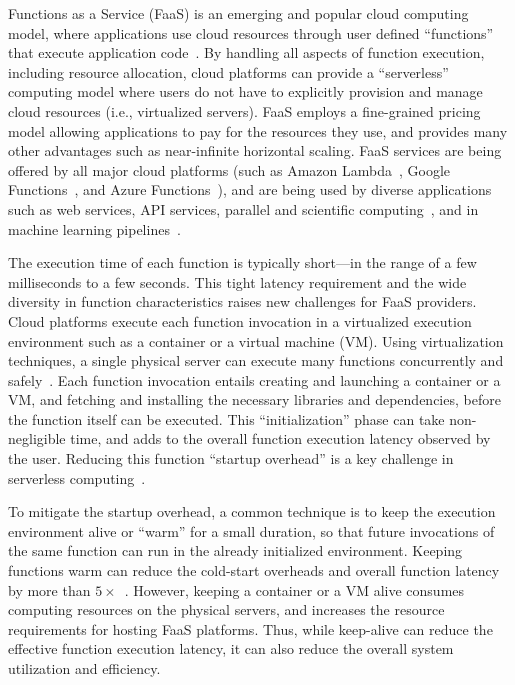 
Functions as a Service (FaaS) is an emerging and popular cloud computing model, where applications use cloud resources through user defined ``functions'' that execute application code~\cite{jonas2017occupy,jonas_cloud_2019,van_eyk_spec_2017}.
By handling all aspects of function execution, including resource allocation, cloud platforms can  provide a ``serverless'' computing model where users do not have to explicitly provision and manage cloud resources (i.e., virtualized servers).
FaaS employs a fine-grained pricing model allowing applications to pay for the resources they use, and provides many other advantages such as near-infinite horizontal scaling. 
FaaS services are being offered by all major cloud platforms (such as Amazon Lambda~\cite{aws-lambda}, Google Functions~\cite{google-functions}, and Azure Functions~\cite{azure-functions}), and are being used by diverse applications such as web services, API services,  parallel and scientific computing~\cite{funcx_hpdc_20,john_sweep_2019,fouladi_laptop_2019}, and in machine learning pipelines~\cite{carreira2018case, carreira_cirrus_2019}. 


The execution time of each function is typically short---in the range of a few milliseconds to a few seconds.
This tight latency requirement and the wide diversity in function characteristics raises new challenges for FaaS providers. 
Cloud platforms execute each function invocation in a virtualized execution environment such as a container or a virtual machine (VM). %
Using virtualization techniques, a single physical server can execute many functions concurrently and safely~\cite{wang2018peeking}. 
Each function invocation entails creating and launching a container or a VM, and fetching and installing the necessary libraries and dependencies, before the function itself can be executed.
This ``initialization'' phase can take non-negligible time, and adds to the overall function execution latency observed by the user. 
Reducing this function ``startup overhead'' is a key challenge in serverless computing~\cite{oakes_sock_2018, hendrickson2016serverless, warm1, warm2}. 


To mitigate the startup overhead, a common technique is to keep the execution environment alive or ``warm'' for a small duration, so that future invocations of the same function can run in the already initialized environment. 
Keeping functions warm can reduce the cold-start overheads and overall function latency by more than  $5\times$~\cite{manner_cold_2018}.  
However, keeping a container or a VM alive consumes computing resources on the physical servers, and increases the resource requirements for hosting FaaS platforms. 
Thus, while keep-alive can reduce the effective function execution latency, it can also reduce the overall system utilization and efficiency.



